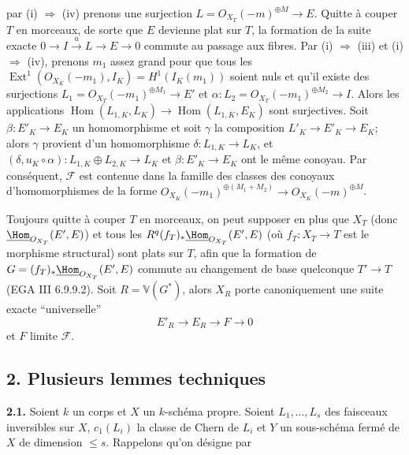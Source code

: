 
par (i) \(\Rightarrow\) (iv) prenons une surjection \(L={O}_{X_T}(-m)^{\oplus M}\longrightarrow E\). Quitte à couper \(T\) en morceaux, de sorte que \(E\) devienne plat sur \(T\), la formation de la suite exacte \(0\longrightarrow I\xrightarrow{u}L\longrightarrow E\longrightarrow0\) commute au passage aux fibres. Par (i) \(\Rightarrow\) (iii) et (i) \(\Rightarrow\) (iv), prenons \(m_1\) assez grand pour que tous les \(\operatorname{Ext}^1({O}_{X_K}(-m_1),I_K)=H^1(I_K(m_1))\) soient nuls et qu'il existe des surjections \(L_1={O}_{X_T}(-m_1)^{\oplus M_1}\longrightarrow E'\) et \(\alpha:L_2={O}_{X_T}(-m_1)^{\oplus M_2}\longrightarrow I\). Alors les applications \(\operatorname{Hom}(L_{1,K},L_K)\longrightarrow \operatorname{Hom}(L_{1,K},E_K)\) sont surjectives. Soit \(\beta:E'_K\to E_K\) un homomorphisme et soit \(\gamma\) la composition \(L'_K\to E'_K\to E_K\); alors \(\gamma\) provient d'un homomorphisme \(\delta:L_{1,K}\to L_K\), et $(\delta,u_K\circ\alpha):L_{1,K}\oplus L_{2,K}\longrightarrow L_K$ et \(\beta:E'_K\to E_K\) ont le même conoyau. Par conséquent, \(\mathcal F\) est contenue dans la famille des classes des conoyaux d'homomorphismes de la forme \({O}_{X_K}(-m_1)^{\oplus(M_1+M_2)}\longrightarrow {O}_{X_K}(-m)^{\oplus M}\).

Toujours quitte à couper \(T\) en morceaux, on peut supposer en plus que \(X_T\) (donc \(\underline{\Hom}_{{O}_{X_T}}(E',E)\)) et tous les \(R^q(f_T)_*\underline{\Hom}_{{O}_{X_T}}(E',E)\) (où \(f_T:X_T\to T\) est le morphisme structural) sont plats sur \(T\), afin que la formation de \(G=(f_T)_*\underline{\Hom}_{{O}_{X_T}}(E',E)\) commute au changement de base quelconque \(T'\to T\) (EGA III 6.9.9.2). Soit $R=\mathbb V(G^*)$, alors \(X_R\) porte canoniquement une suite exacte ``universelle''
\[
E'_R\longrightarrow E_R\longrightarrow F\longrightarrow0
\]
et \(F\) limite \(\mathcal F\).

\subsection*{2. Plusieurs lemmes techniques}
\textbf{2.1.} Soient \(k\) un corps et \(X\) un \(k\)-schéma propre. Soient \(L_1,\ldots,L_s\) des faisceaux inversibles sur \(X\), \(c_1(L_i)\) la classe de Chern de \(L_i\) et \(Y\) un sous-schéma fermé de \(X\) de dimension \(\le s\). Rappelons qu'on désigne par
